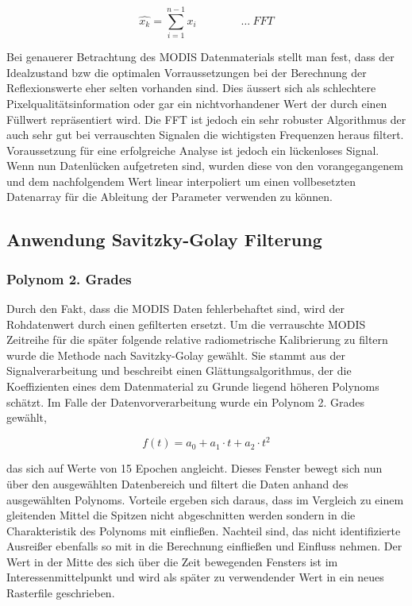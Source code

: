 \documentclass[11pt]{report}
\begin{document}
\begin{equation}
\hat{x_k}=\sum_{i=1}^{n-1} x_i \qquad\qquad \dots \ FFT
\end{equation}



Bei genauerer Betrachtung des MODIS Datenmaterials stellt man fest, dass der Idealzustand bzw die optimalen Vorraussetzungen bei der Berechnung der Reflexionswerte eher selten vorhanden sind. Dies äussert sich als schlechtere Pixelqualitätsinformation oder gar ein nichtvorhandener Wert der durch einen Füllwert repräsentiert wird. Die FFT ist jedoch ein sehr robuster Algorithmus der auch sehr gut bei verrauschten Signalen die wichtigsten Frequenzen heraus filtert. Voraussetzung für eine erfolgreiche Analyse ist jedoch ein lückenloses Signal. Wenn nun Datenlücken aufgetreten sind, wurden diese von den vorangegangenem und dem nachfolgendem Wert linear interpoliert um einen vollbesetzten Datenarray für die Ableitung der Parameter verwenden zu können. 


\subsection{Anwendung Savitzky-Golay Filterung}

\subsubsection{Polynom 2. Grades}
Durch den Fakt, dass die MODIS Daten fehlerbehaftet sind, wird der Rohdatenwert durch einen gefilterten ersetzt. Um die verrauschte MODIS Zeitreihe für die später folgende relative radiometrische Kalibrierung zu filtern wurde die Methode nach Savitzky-Golay gewählt. Sie stammt aus der Signalverarbeitung und beschreibt einen Glättungsalgorithmus, der die Koeffizienten eines dem Datenmaterial zu Grunde liegend höheren Polynoms schätzt. 
Im Falle der Datenvorverarbeitung wurde ein Polynom 2. Grades gewählt, 

\begin{equation}
f(t) = a_0+a_1 \cdot t+a_2 \cdot t^2
\end{equation}

das sich auf Werte von 15 Epochen angleicht. Dieses Fenster bewegt sich nun über den ausgewählten Datenbereich und filtert die Daten anhand des ausgewählten Polynoms. Vorteile ergeben sich daraus, dass im Vergleich zu einem gleitenden Mittel die Spitzen nicht abgeschnitten werden sondern in die Charakteristik des Polynoms mit einfließen. Nachteil sind, das nicht identifizierte Ausreißer ebenfalls so mit in die Berechnung einfließen und Einfluss nehmen. Der Wert in der Mitte des sich über die Zeit bewegenden Fensters ist im Interessenmittelpunkt und wird als später zu verwendender Wert in ein neues Rasterfile geschrieben.
\end{document}
